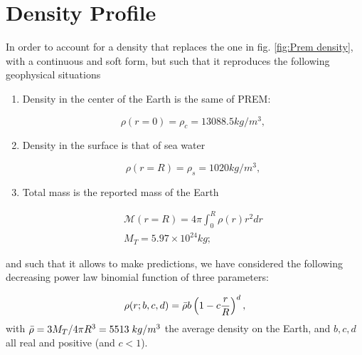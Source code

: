 \documentclass[aps,twocolumn,showpacs,preprintnumbers]{revtex4}
\begin{document}
    
\section{Density Profile}\label{density section}

    In order to account for a density that replaces the one in fig. \ref{fig:Prem density}, with a continuous and soft form, but such that it reproduces the following geophysical situations 
    
    \begin{enumerate}
        \item Density in the center of the Earth is the same of PREM:
        
        \begin{equation}
            \rho(r = 0) = \rho_c = 13088.5 kg/m^3,
            \label{1 - Density condition in the center}
        \end{equation}
        
        \item Density in the surface is that of sea water
        
        \begin{equation}
            \rho(r=R) = \rho_s = 1020kg/m^3,
            \label{1 - Density condition in the surface}
        \end{equation}
        
        \item Total mass is the reported mass of the Earth
        
        \begin{equation}
        \begin{aligned}
            \mathcal{M}(r=R) = 4 \pi \int_0^{R} \rho(r) r^2 dr \\
                      M_T = 5.97 \times 10^{24} kg; 
        \end{aligned}   
        \label{1 - Density condition, total mass}
        \end{equation}
    \end{enumerate}
    and such that it allows to make predictions, we have considered the following decreasing power law binomial function of three parameters:
    
    \begin{equation}
        \rho(r; b, c, d) = \Bar{\rho} b \left( 1 - c \frac{r}{R}\right)^d,
        \label{1 - General density form}
    \end{equation}
    with $\Bar{\rho} = 3M_T/4 \pi R^3 = 5513\; kg/m^3$ the average density on the Earth, and $b, c, d$ all real and positive (and $c < 1$). 
    
\end{document}
